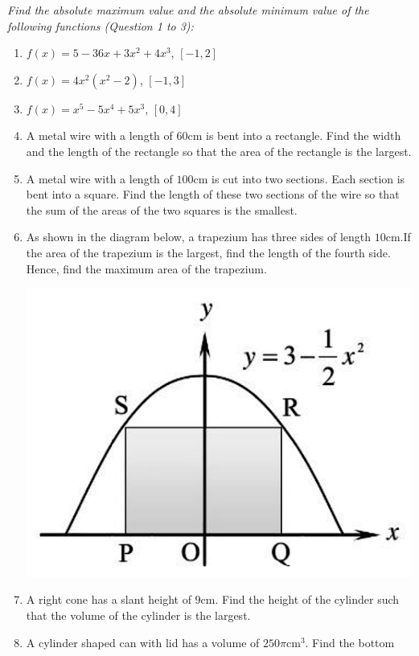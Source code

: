 \documentclass{report}
\begin{document}
\noindent \hspace{1.2em}\textit{Find the absolute maximum value and the absolute minimum value of the following functions (Question 1 to 3):}
\begin{enumerate}
    \item $f(x)=5-36 x+3 x^2+4 x^3$, $[-1,2]$
    \item $f(x)=4 x^2\left(x^2-2\right)$, $[-1,3]$
    \item $f(x)=x^5-5 x^4+5 x^3$, $[0,4]$
    \item A metal wire with a length of $60$cm is bent into a rectangle. Find the width
          and the length of the rectangle so that the area of the rectangle is the
          largest.
    \item A metal wire with a length of $100$cm is cut into two sections. Each section is
          bent into a square. Find the length of these two sections of the wire so that
          the sum of the areas of the two squares is the smallest.
    \item As shown in the diagram below, a trapezium has three sides of length $10$cm.If
          the area of the trapezium is the largest, find the length of the fourth side.
          Hence, find the maximum area of the trapezium.
          \begin{center}
              \includegraphics[scale=0.25]{assets/26-9.png}
          \end{center}
    \item A right cone has a slant height of $9$cm. Find the height of the cylinder such
          that the volume of the cylinder is the largest.
    \item A cylinder shaped can with lid has a volume of $250\pi$cm$^3$. Find the bottom

\end{enumerate}
\end{document}
